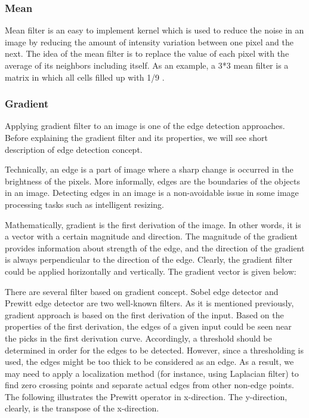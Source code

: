 \documentclass{article}
\begin{document}
		\subsubsection{Mean}
			Mean filter is an easy to implement kernel which is used to reduce the noise in an image by reducing the amount of intensity variation between one
			pixel and the next. The idea of the mean filter is to replace the value of each pixel with the average of its neighbors including itself. As an example,
			a 3*3 mean filter is a matrix in which all cells filled up with 1/9 .	
		
		\subsubsection{Gradient}

			Applying gradient filter to an image is one of the edge detection approaches. Before explaining the gradient filter and its properties, we will see
			short description of edge detection concept. 
			
			Technically, an edge is a part of image where a sharp change is occurred in the brightness of the pixels.
			More informally, edges are the boundaries of
			the objects in an image. Detecting edges in an image is a non-avoidable issue in some image processing tasks such as intelligent resizing.
			
			Mathematically, gradient is the first derivation of the image. In other words, it is a vector with a certain magnitude and direction. 
			The magnitude of the gradient provides information about strength
			of the edge, and the direction of the gradient is always perpendicular to the direction of the edge. Clearly, the gradient filter could be
			applied horizontally and vertically. The gradient vector is given below:

			There are several filter based on gradient concept. Sobel edge detector and Prewitt edge detector are two well-known filters.
			As it is mentioned previously, gradient approach is based on the first derivation of the input. Based on the properties of
			the first derivation, the edges of a given input could be seen near the picks in the first derivation curve. Accordingly, a threshold should be
			determined in order for the edges to be detected. However, since a thresholding is used, the edges might be too thick to be considered
			as an edge. As a result, we may need to apply a localization method (for instance, using Laplacian filter) to find zero
			crossing points and separate actual edges from other non-edge points. The following illustrates the Prewitt operator in x-direction. The y-direction, clearly, is the transpose of the x-direction.
\end{document}
